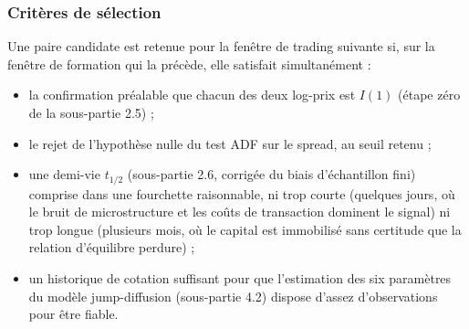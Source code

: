\documentclass{article}
\begin{document}
\subsubsection*{Critères de sélection}
Une paire candidate est retenue pour la fenêtre de trading suivante si, sur la fenêtre de formation qui la précède, elle satisfait simultanément :
\begin{itemize}
\item la confirmation préalable que chacun des deux log-prix est $I(1)$ (étape zéro de la sous-partie 2.5) ;
\item le rejet de l'hypothèse nulle du test ADF sur le spread, au seuil retenu ;
\item une demi-vie $t_{1/2}$ (sous-partie 2.6, corrigée du biais d'échantillon fini) comprise dans une fourchette raisonnable, ni trop courte (quelques jours, où le bruit de microstructure et les coûts de transaction dominent le signal) ni trop longue (plusieurs mois, où le capital est immobilisé sans certitude que la relation d'équilibre perdure) ;
\item un historique de cotation suffisant pour que l'estimation des six paramètres du modèle jump-diffusion (sous-partie 4.2) dispose d'assez d'observations pour être fiable.
\end{itemize}
\end{document}
